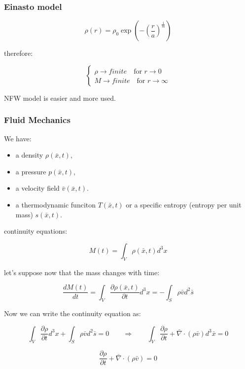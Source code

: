 

\subsubsection{Einasto model}

$$
\rho(r) = \rho_0 \exp \left( - \left( \dfrac{r}{a} \right) ^{\frac{1}{m}} \right)
$$

therefore:

$$
\begin{cases}
\rho \to finite \quad \text{for } r \to 0 \\
M \to finite \quad \text{for } r \to \infty
\end{cases}
$$

\begin{tipsblock}[In practice]
    NFW model is easier and more used.
\end{tipsblock}

\subsubsection{Fluid Mechanics}

We have:

\begin{itemize}
    \item a density $\rho(\bar x, t)$,
    \item a pressure $p(\bar x, t)$,
    \item a velocity field $\bar v(\bar x, t)$.
    \item a thermodynamic funciton $T(\bar x, t)$ or a specific entropy (entropy per unit mass) $s(\bar x, t)$.
\end{itemize}


continuity equations:

$$
M(t) = \int_V \rho(\bar x, t) d^3 x
$$

let's suppose now that the mass changes with time:

$$
\dfrac{dM(t)}{dt} = \int_V \dfrac{\partial \rho(\bar x, t)}{\partial t} d^3 x = - \int_S \rho \bar v d^2 \bar s
$$

Now we can write the continuity equation as:

$$
\int_V \dfrac{\partial \rho}{\partial t} d^3 x + \int_S \rho \bar v d^2 \bar s = 0
\qquad \Rightarrow \qquad
\int_V \dfrac{\partial \rho}{\partial t} + \bar \nabla \cdot (\rho \bar v) d^3 \bar x = 0
$$

$$
\boxed{
\dfrac{\partial \rho}{\partial t} + \bar \nabla \cdot (\rho \bar v) = 0
}
$$

